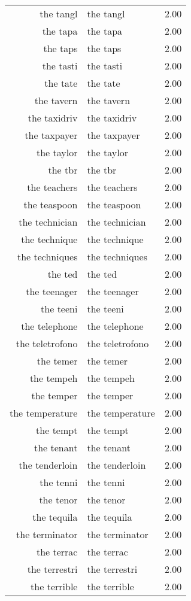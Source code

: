 \begin{table}[ht]
\begin{tabular}{rlr}
  the tangl & the tangl & 2.00 \\ 
  the tapa & the tapa & 2.00 \\ 
  the taps & the taps & 2.00 \\ 
  the tasti & the tasti & 2.00 \\ 
  the tate & the tate & 2.00 \\ 
  the tavern & the tavern & 2.00 \\ 
  the taxidriv & the taxidriv & 2.00 \\ 
  the taxpayer & the taxpayer & 2.00 \\ 
  the taylor & the taylor & 2.00 \\ 
  the tbr & the tbr & 2.00 \\ 
  the teachers & the teachers & 2.00 \\ 
  the teaspoon & the teaspoon & 2.00 \\ 
  the technician & the technician & 2.00 \\ 
  the technique & the technique & 2.00 \\ 
  the techniques & the techniques & 2.00 \\ 
  the ted & the ted & 2.00 \\ 
  the teenager & the teenager & 2.00 \\ 
  the teeni & the teeni & 2.00 \\ 
  the telephone & the telephone & 2.00 \\ 
  the teletrofono & the teletrofono & 2.00 \\ 
  the temer & the temer & 2.00 \\ 
  the tempeh & the tempeh & 2.00 \\ 
  the temper & the temper & 2.00 \\ 
  the temperature & the temperature & 2.00 \\ 
  the tempt & the tempt & 2.00 \\ 
  the tenant & the tenant & 2.00 \\ 
  the tenderloin & the tenderloin & 2.00 \\ 
  the tenni & the tenni & 2.00 \\ 
  the tenor & the tenor & 2.00 \\ 
  the tequila & the tequila & 2.00 \\ 
  the terminator & the terminator & 2.00 \\ 
  the terrac & the terrac & 2.00 \\ 
  the terrestri & the terrestri & 2.00 \\ 
  the terrible & the terrible & 2.00 \\ 

\end{tabular}
\end{table}
